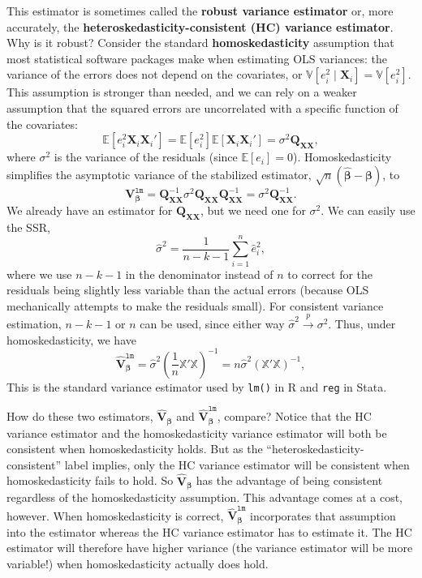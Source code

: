 \documentclass[
  13pt,
  letterpaper,
  DIV=11,
  numbers=noendperiod]{scrreprt}
\newcommand{\mb}{\symbf}
\newcommand{\E}{\mathbb{E}}
\newcommand{\V}{\mathbb{V}}
\newcommand{\X}{\mb{X}}
\newcommand{\Xmat}{\mathbb{X}}
\newcommand{\bfbeta}{\mb{\beta}}
\newcommand{\bhat}{\widehat{\mb{\beta}}}
\newcommand{\inprob}{\overset{p}{\to}}
\theoremstyle{plain}
\theoremstyle{definition}
\theoremstyle{definition}
\theoremstyle{remark}
\begin{document}
This estimator is sometimes called the \textbf{robust variance
estimator} or, more accurately, the
\textbf{heteroskedasticity-consistent (HC) variance estimator}. Why is
it robust? Consider the standard \textbf{homoskedasticity} assumption
that most statistical software packages make when estimating OLS
variances: the variance of the errors does not depend on the covariates,
or \(\V[e_{i}^{2} \mid \X_{i}] = \V[e_{i}^{2}]\). This assumption is
stronger than needed, and we can rely on a weaker assumption that the
squared errors are uncorrelated with a specific function of the
covariates: \[ 
\E[e_{i}^{2}\X_{i}\X_{i}'] = \E[e_{i}^{2}]\E[\X_{i}\X_{i}'] = \sigma^{2}\mb{Q}_{\X\X}, 
\] where \(\sigma^2\) is the variance of the residuals (since
\(\E[e_{i}] = 0\)). Homoskedasticity simplifies the asymptotic variance
of the stabilized estimator, \(\sqrt{n}(\bhat - \bfbeta)\), to \[ 
\mb{V}^{\texttt{lm}}_{\bfbeta} = \mb{Q}_{\X\X}^{-1}\sigma^{2}\mb{Q}_{\X\X}\mb{Q}_{\X\X}^{-1} = \sigma^2\mb{Q}_{\X\X}^{-1}.
\] We already have an estimator for \(\mb{Q}_{\X\X}\), but we need one
for \(\sigma^2\). We can easily use the SSR, \[ 
\widehat{\sigma}^{2} = \frac{1}{n-k-1} \sum_{i=1}^{n} \widehat{e}_{i}^{2},
\] where we use \(n-k-1\) in the denominator instead of \(n\) to correct
for the residuals being slightly less variable than the actual errors
(because OLS mechanically attempts to make the residuals small). For
consistent variance estimation, \(n-k -1\) or \(n\) can be used, since
either way \(\widehat{\sigma}^2 \inprob \sigma^2\). Thus, under
homoskedasticity, we have \[ 
\widehat{\mb{V}}_{\bfbeta}^{\texttt{lm}} = \widehat{\sigma}^{2}\left(\frac{1}{n}\Xmat'\Xmat\right)^{{-1}} = n\widehat{\sigma}^{2}\left(\Xmat'\Xmat\right)^{{-1}},
\] This is the standard variance estimator used by \texttt{lm()} in R
and \texttt{reg} in Stata.

How do these two estimators, \(\widehat{\mb{V}}_{\bfbeta}\) and
\(\widehat{\mb{V}}_{\bfbeta}^{\texttt{lm}}\), compare? Notice that the
HC variance estimator and the homoskedasticity variance estimator will
both be consistent when homoskedasticity holds. But as the
``heteroskedasticity-consistent'' label implies, only the HC variance
estimator will be consistent when homoskedasticity fails to hold. So
\(\widehat{\mb{V}}_{\bfbeta}\) has the advantage of being consistent
regardless of the homoskedasticity assumption. This advantage comes at a
cost, however. When homoskedasticity is correct,
\(\widehat{\mb{V}}_{\bfbeta}^{\texttt{lm}}\) incorporates that
assumption into the estimator whereas the HC variance estimator has to
estimate it. The HC estimator will therefore have higher variance (the
variance estimator will be more variable!) when homoskedasticity
actually does hold.
\end{document}
